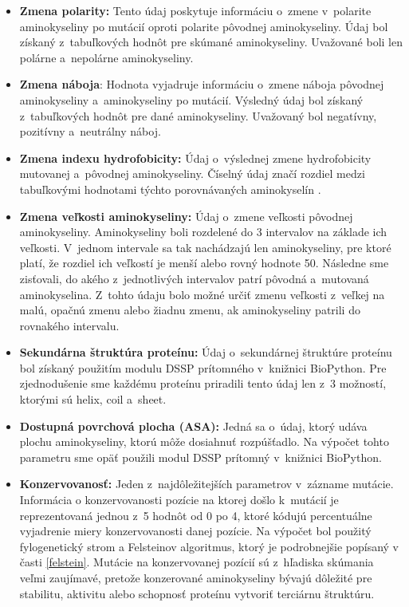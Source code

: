 \begin{itemize}
	\item \textbf{Zmena polarity:} Tento údaj poskytuje informáciu o~zmene v~polarite aminokyseliny po mutácií oproti polarite pôvodnej aminokyseliny. Údaj bol získaný z~tabuľkových hodnôt pre skúmané aminokyseliny. Uvažované boli len polárne a~nepolárne aminokyseliny.
	\item \textbf{Zmena náboja}: Hodnota vyjadruje informáciu o~zmene náboja pôvodnej aminokyseliny a~aminokyseliny po mutácií. Výsledný údaj bol získaný z~tabuľkových hodnôt pre dané aminokyseliny. Uvažovaný bol negatívny, pozitívny a~neutrálny náboj. 
	\item \textbf{Zmena indexu hydrofobicity:} Údaj o~výslednej zmene hydrofobicity mutovanej a~pôvodnej aminokyseliny. Číselný údaj značí rozdiel medzi tabuľkovými hodnotami týchto porovnávaných aminokyselín \cite{hydrophobicity}. 
	\item \textbf{Zmena veľkosti aminokyseliny:} Údaj o~zmene veľkosti pôvodnej aminokyseliny. Aminokyseliny boli rozdelené do 3 intervalov na základe ich veľkosti. V~jednom intervale sa tak nachádzajú len aminokyseliny, pre ktoré platí, že rozdiel ich veľkostí je menší alebo rovný hodnote 50. Následne sme zisťovali, do akého z~jednotlivých intervalov patrí pôvodná a~mutovaná aminokyselina. Z~tohto údaju bolo možné určiť zmenu veľkosti z~veľkej na malú, opačnú zmenu alebo žiadnu zmenu, ak aminokyseliny patrili do rovnakého intervalu.
	\item \textbf{Sekundárna štruktúra proteínu:} Údaj o~sekundárnej štruktúre proteínu bol získaný použitím modulu DSSP prítomného v knižnici BioPython. Pre zjednodušenie sme každému proteínu priradili tento údaj len z~3 možností, ktorými sú helix, coil a sheet.
	\item \textbf{Dostupná povrchová plocha (ASA):} Jedná sa o~údaj, ktorý udáva plochu aminokyseliny, ktorú môže dosiahnuť rozpúšťadlo. Na výpočet tohto parametru sme opäť použili modul DSSP prítomný v~knižnici BioPython.
	\item \textbf{Konzervovanosť:} Jeden z~najdôležitejších parametrov v~zázname mutácie. Informácia o konzervovanosti pozície na ktorej došlo k~mutácií je reprezentovaná
	jednou z~5 hodnôt od 0 po 4, ktoré kódujú percentuálne vyjadrenie miery konzervovanosti danej pozície. Na výpočet bol použitý fylogenetický strom a Felsteinov algoritmus, ktorý je podrobnejšie popísaný v časti \ref{felstein}. Mutácie na konzervovanej pozícií sú z~hľadiska skúmania veľmi zaujímavé, pretože konzerované aminokyseliny bývajú dôležité pre stabilitu, aktivitu alebo schopnosť proteínu vytvoriť terciárnu štruktúru.

\end{itemize}
